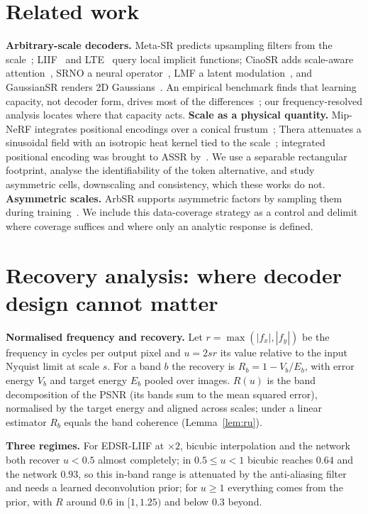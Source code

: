 \documentclass[conference]{IEEEtran}
\begin{document}
\section{Related work}
\textbf{Arbitrary-scale decoders.} Meta-SR predicts upsampling filters from the scale~\cite{hu2019metasr}; LIIF~\cite{chen2021liif} and LTE~\cite{lee2022lte} query local implicit functions; CiaoSR adds scale-aware attention~\cite{cao2023ciaosr}, SRNO a neural operator~\cite{wei2023srno}, LMF a latent modulation~\cite{he2024lmf}, and GaussianSR renders 2D Gaussians~\cite{hu2024gaussiansr}. An empirical benchmark finds that learning capacity, not decoder form, drives most of the differences~\cite{nasir2026empirical}; our frequency-resolved analysis locates where that capacity acts.
\textbf{Scale as a physical quantity.} Mip-NeRF integrates positional encodings over a conical frustum~\cite{barron2021mipnerf}; Thera attenuates a sinusoidal field with an isotropic heat kernel tied to the scale~\cite{becker2025thera}; integrated positional encoding was brought to ASSR by~\cite{liu2021ipe}. We use a separable rectangular footprint, analyse the identifiability of the token alternative, and study asymmetric cells, downscaling and consistency, which these works do not.
\textbf{Asymmetric scales.} ArbSR supports asymmetric factors by sampling them during training~\cite{wang2021arbsr}. We include this data-coverage strategy as a control and delimit where coverage suffices and where only an analytic response is defined.

\section{Recovery analysis: where decoder design cannot matter}
\label{sec:analysis}
\textbf{Normalised frequency and recovery.} Let $r=\max(|f_x|,|f_y|)$ be the frequency in cycles per output pixel and $u=2sr$ its value relative to the input Nyquist limit at scale $s$. For a band $b$ the recovery is $R_b = 1 - V_b/E_b$, with error energy $V_b$ and target energy $E_b$ pooled over images. $R(u)$ is the band decomposition of the PSNR (its bands sum to the mean squared error), normalised by the target energy and aligned across scales; under a linear estimator $R_b$ equals the band coherence (Lemma~\ref{lem:ru}).

\textbf{Three regimes.} For EDSR-LIIF at $\times2$, bicubic interpolation and the network both recover $u<0.5$ almost completely; in $0.5\le u<1$ bicubic reaches $0.64$ and the network $0.93$, so this in-band range is attenuated by the anti-aliasing filter and needs a learned deconvolution prior; for $u\ge1$ everything comes from the prior, with $R$ around $0.6$ in $[1,1.25)$ and below $0.3$ beyond.
\end{document}
